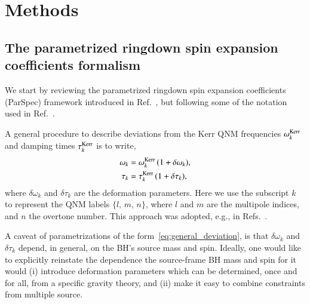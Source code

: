 \documentclass[twocolumn,
               prd,
               aps,
               superscriptaddress,
               tightenlines,
               nofootinbib,
               eqsecnum,
               amsfonts,
               amsmath,
               longbibliography]{revtex4-1}
\begin{document}
\section{Methods}
\label{sec:method}

\subsection{The parametrized ringdown spin expansion coefficients formalism}
\label{sec:review_parspec}

We start by reviewing the parametrized ringdown spin expansion coefficients (ParSpec)
framework introduced in Ref.~\cite{Maselli:2019mjd}, but following
some of the notation used in Ref.~\cite{Carullo:2021dui}.

A general procedure to describe deviations from the Kerr QNM frequencies $\omega_{k}^{\rm Kerr}$ and
damping times $\tau_{k}^{\rm Kerr}$ is to write,
%
\begin{subequations}
\label{eq:general_deviation}
\begin{align}
\omega_{k} &= \omega^{\rm Kerr}_{k} \, (1 + \delta \omega_{k}), \\
\tau_{k}   &= \tau^{\rm Kerr}_{k}   \, (1 + \delta \tau_{k}),
\end{align}
\end{subequations}
%
where $\delta\omega_{k}$ and $\delta\tau_{k}$ are the deformation parameters.
%
Here we use the subscript $k$ to represent the QNM labels $\{l,\, m,\, n\}$,
where $l$ and $m$ are the multipole indices, and $n$ the overtone number.
%
This approach was adopted, e.g., in Refs.~\cite{Gossan:2011ha,Meidam:2014jpa,Carullo:2018sfu}.

A caveat of parametrizations of the form~\eqref{eq:general_deviation}, is that
$\delta\omega_{k}$ and $\delta\tau_{k}$ depend, in general, on the BH's source mass and spin.
%
Ideally, one would like to explicitly reinstate the dependence the source-frame
BH mass and spin for it would
%
%
(i) introduce deformation parameters which can be determined, once and for
all, from a specific gravity theory, and
%
(ii) make it easy to combine constraints from multiple source.
\end{document}
